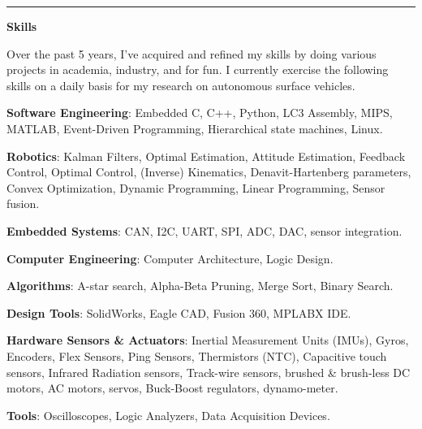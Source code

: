 \documentclass[paper=a4,fontsize=11pt]{article} %
\def \sectionSpace      {0.3cm}    %
\def \subSectionSpace   {0.25cm}     %
\def \leftColSpace      {0.1}       %
\def \bigMiddleColSpace {0.8}       %
\def \lineWidth         {20.25cm}   %
\def \lineThickness     {1pt}     %
\begin{document}
    \noindent\rule{\lineWidth}{\lineThickness}

    \noindent
    \begin{minipage}[t]{\leftColSpace\linewidth}
    \noindent \textbf{Skills}\\
    \end{minipage}
    \begin{minipage}[t]{\bigMiddleColSpace\linewidth}
            \noindent Over the past 5 years, I've acquired and refined my skills by doing various projects in academia, industry, and for fun. I currently exercise the following skills on a daily basis for my research on autonomous surface vehicles. 
            
            \vspace{\subSectionSpace}
            \noindent \textbf{Software Engineering}: Embedded C, C++, Python, LC3 Assembly, MIPS, MATLAB, Event-Driven Programming, Hierarchical state machines, Linux.
            
            \vspace{\subSectionSpace}
            \noindent \textbf{Robotics}: Kalman Filters, Optimal Estimation, Attitude Estimation, Feedback Control, Optimal Control, (Inverse) Kinematics, Denavit-Hartenberg parameters, Convex Optimization, Dynamic Programming, Linear Programming, Sensor fusion.
            
            \vspace{\subSectionSpace}
            \noindent \textbf{Embedded Systems}: CAN, I2C, UART, SPI, ADC, DAC, sensor integration.
            
            \vspace{\subSectionSpace}
            \noindent \textbf{Computer Engineering}: Computer Architecture, Logic Design.
            
            \vspace{\subSectionSpace}
            \noindent \textbf{Algorithms}: A-star search, Alpha-Beta Pruning, Merge Sort, Binary Search.
            
            \vspace{\subSectionSpace}
            \noindent \textbf{Design Tools}: SolidWorks, Eagle CAD, Fusion 360, MPLABX IDE.
            
            \vspace{\subSectionSpace}
            \noindent \textbf{Hardware Sensors \& Actuators}: Inertial Measurement Units (IMUs), Gyros, Encoders, Flex Sensors, Ping Sensors, Thermistors (NTC), Capacitive touch sensors, Infrared Radiation sensors, Track-wire sensors, brushed \& brush-less DC motors, AC motors, servos, Buck-Boost regulators, dynamo-meter.

            \vspace{\subSectionSpace}
            \noindent \textbf{Tools}: Oscilloscopes, Logic Analyzers, Data Acquisition Devices.
    \end{minipage}
\end{document}
